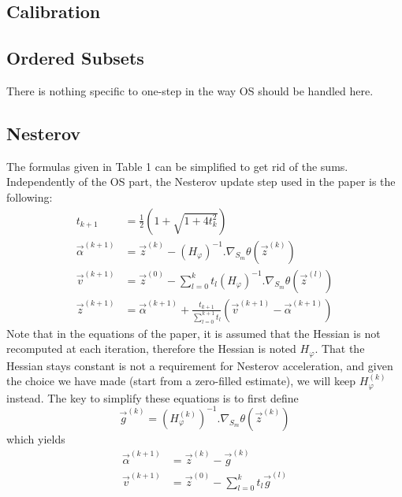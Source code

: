 \documentclass[a4paper, 10pt]{article}
\begin{document}
\subsection{Calibration}
\subsection{Ordered Subsets}
There is nothing specific to one-step in the way OS should be handled here.
\subsection{Nesterov}
The formulas given in Table 1 can be simplified to get rid of the sums. Independently of the OS part, the Nesterov update step
used in the paper is the following:
\begin{equation*}
 \begin{split}
  t_{k+1} &= \frac{1}{2} \left( 1 + \sqrt{1 + 4 t_k^2} \right) \\
  \vec{\alpha}^{(k+1)} &= \vec{z}^{(k)} - \left( H_{\varphi} \right)^{-1}.\nabla_{S_m} \theta \left( \vec{z}^{(k)} \right) \\
  \vec{v}^{(k+1)} &= \vec{z}^{(0)} - \sum_{l=0}^{k} t_l \left( H_{\varphi} \right)^{-1}.\nabla_{S_m} \theta \left( \vec{z}^{(l)} \right) \\
  \vec{z}^{(k+1)} &= \vec{\alpha}^{(k+1)} + \frac{t_{k+1}}{\sum_{l=0}^{k+1} t_l} \left( \vec{v}^{(k+1)} - \vec{\alpha}^{(k+1)} \right)
 \end{split}
\end{equation*}
Note that in the equations of the paper, it is assumed that the Hessian is not recomputed at each iteration, therefore the Hessian is noted $H_{\varphi}$. 
That the Hessian stays constant is not a requirement for Nesterov acceleration, and given the choice we have
made (start from a zero-filled estimate), we will keep $H_{\varphi}^{(k)}$ instead. The key to simplify these equations is to first define 
\begin{equation*}
  \vec{g}^{(k)} = \left( H_{\varphi}^{(k)} \right)^{-1}.\nabla_{S_m} \theta \left( \vec{z}^{(k)} \right)
\end{equation*}
which yields
\begin{equation*}
 \begin{split}
  \vec{\alpha}^{(k+1)} &= \vec{z}^{(k)} - \vec{g}^{(k)} \\
  \vec{v}^{(k+1)} &= \vec{z}^{(0)} - \sum_{l=0}^{k} t_l \vec{g}^{(l)}
 \end{split}
\end{equation*}
\end{document}
